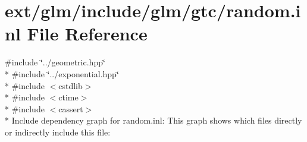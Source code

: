\hypertarget{random_8inl}{\section{ext/glm/include/glm/gtc/random.inl File Reference}
\label{random_8inl}
}
{\ttfamily \#include \char`\"{}../geometric.\-hpp\char`\"{}}\\*
{\ttfamily \#include \char`\"{}../exponential.\-hpp\char`\"{}}\\*
{\ttfamily \#include $<$cstdlib$>$}\\*
{\ttfamily \#include $<$ctime$>$}\\*
{\ttfamily \#include $<$cassert$>$}\\*
Include dependency graph for random.\-inl\-:
This graph shows which files directly or indirectly include this file\-:
